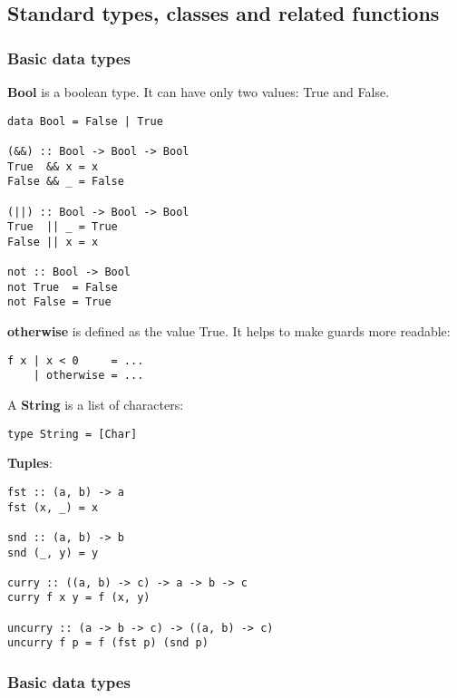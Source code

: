 %

\subsection{Standard types, classes and related functions}

\subsubsection{Basic data types}
\textbf{Bool} is a boolean type. It can have only two values: True and False.
\begin{verbatim}
data Bool = False | True

(&&) :: Bool -> Bool -> Bool
True  && x = x
False && _ = False

(||) :: Bool -> Bool -> Bool
True  || _ = True
False || x = x

not :: Bool -> Bool
not True  = False
not False = True
\end{verbatim}

\textbf{otherwise} is defined as the value True. It helps to make guards more readable:
\begin{verbatim}
f x | x < 0     = ...
    | otherwise = ...
\end{verbatim}





A \textbf{String} is a list of characters:
\begin{verbatim}
type String = [Char]
\end{verbatim}

\textbf{Tuples}:
\begin{verbatim}
fst :: (a, b) -> a
fst (x, _) = x

snd :: (a, b) -> b
snd (_, y) = y

curry :: ((a, b) -> c) -> a -> b -> c
curry f x y = f (x, y)

uncurry :: (a -> b -> c) -> ((a, b) -> c)
uncurry f p = f (fst p) (snd p)
\end{verbatim}

\subsubsection{Basic data types}

